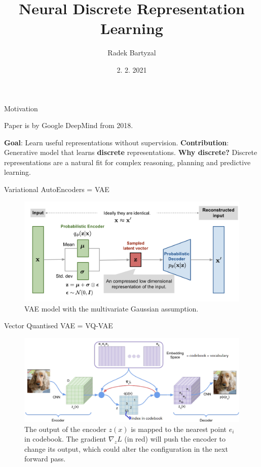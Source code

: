 \documentclass{beamer}
\begin{document}
\title[VQ-VAE]{Neural Discrete Representation Learning}  
\author{Radek Bartyzal}
\date{2. 2. 2021} 

\frame{\titlepage} 

\begin{frame}{Motivation}

Paper is by Google DeepMind from 2018.
\vfill

\textbf{Goal}:
Learn useful representations without supervision.
\vfill
\textbf{Contribution}:
Generative model that learns \textbf{discrete} representations.
\vfill
\textbf{Why discrete?}
Discrete representations are a natural fit for complex reasoning, planning and predictive learning.

\end{frame}
\begin{frame}{Variational AutoEncoders = VAE}

\begin{figure}[h]
\includegraphics[width=\textwidth]{img/vae-gaussian}
\caption{VAE model with the multivariate Gaussian assumption. \cite{cit:vae}}
\end{figure}

\end{frame}
\begin{frame}{Vector Quantised VAE = VQ-VAE}

\begin{figure}[h]
\includegraphics[width=\textwidth]{img/arch}
\caption{The output of the encoder $z(x)$ is mapped to the nearest point $e_i$ in codebook. The gradient $\nabla_zL$ (in red) will push the encoder to change its output, which could alter the configuration in the next forward pass.}
\end{figure}

\end{frame}
\end{document}

